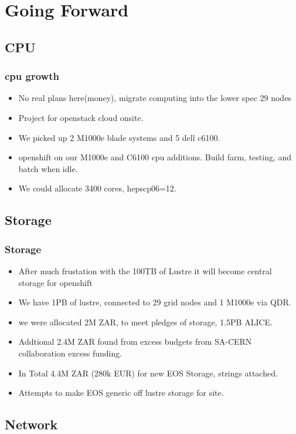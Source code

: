 \documentclass{beamer}
\begin{document}
\section{Going Forward}
\subsection{CPU}
\begin{frame}
    \frametitle{cpu growth}
    \begin{itemize}
    \item No real plans here(money), migrate computing into the lower spec 29 nodes
    \item Project for openstack cloud onsite.
        \item We picked up 2 M1000e blade systems and 5 dell c6100.
    \item openshift on our M1000e and C6100 cpu additions. Build farm, testing, and batch when idle.
    \item We could allocate 3400 cores, hepscp06=12.
    \end{itemize}

\end{frame}


\subsection{Storage}
\begin{frame}
    \frametitle{Storage}
    \begin{itemize}
            \item<1-> After much frustation with the 100TB of Lustre it will become central storage for openshift
            \item<2-> We have 1PB of lustre, connected to 29 grid nodes and 1 M1000e via QDR.
            \item<3-> we were allocated 2M ZAR, to meet pledges of storage, 1.5PB ALICE.
            \item<4-> Addtional 2.4M ZAR found from excess budgets from SA-CERN collaboration excess funding.
            \item<5-> In Total 4.4M ZAR (280k EUR) for new EOS Storage, strings attached.
            \item<6-> Attempts to make EOS generic off lustre storage for site.
    \end{itemize}
    \end{frame}
\subsection{Network}
\end{document}
